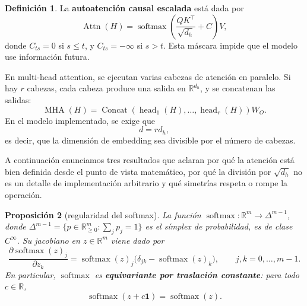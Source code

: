 \documentclass[11pt]{report}
\newenvironment{tcolorbox}[1][]{\par\medskip\noindent\ignorespaces}{\par\medskip}
\theoremstyle{definition}
\newtheorem{definicion}{Definición}[section]
\theoremstyle{plain}
\newtheorem{proposicion}[definicion]{Proposición}
\numberwithin{equation}{section}
\newcommand{\R}{\mathbb{R}}
\newcommand{\softmax}{\operatorname{softmax}}
\begin{document}
\begin{tcolorbox}[colback=blue!8, colframe=blue!8, boxrule=0pt]
\begin{definicion}
La \textbf{autoatención causal escalada} está dada por
\begin{equation*}
    \operatorname{Attn}(H)
    =
    \operatorname{softmax}
    \left(
        \frac{QK^\top}{\sqrt{d_h}}
        +
        C
    \right)V,
\end{equation*}
donde \(C_{ts}=0\) si \(s\leq t\), y \(C_{ts}=-\infty\) si \(s>t\). Esta máscara impide que el modelo use información futura.
\end{definicion}
\end{tcolorbox}

En multi-head attention, se ejecutan varias cabezas de atención en paralelo. Si hay \(r\) cabezas, cada cabeza produce una salida en \(\mathbb{R}^{d_h}\), y se concatenan las salidas:
\begin{equation*}
    \operatorname{MHA}(H)
    =
    \operatorname{Concat}(\operatorname{head}_1(H),\ldots,\operatorname{head}_r(H))W_O.
\end{equation*}
En el modelo implementado, se exige que
\begin{equation*}
    d=r d_h,
\end{equation*}
es decir, que la dimensión de embedding sea divisible por el número de cabezas.

A continuación enunciamos tres resultados que aclaran por qué la atención está bien definida desde el punto de vista matemático, por qué la división por \(\sqrt{d_h}\) no es un detalle de implementación arbitrario y qué simetrías respeta o rompe la operación.

\begin{tcolorbox}[colback=blue!8, colframe=blue!8, boxrule=0pt]
\begin{proposicion}[regularidad del softmax]
La función \(\softmax:\R^m\to\Delta^{m-1}\), donde \(\Delta^{m-1}=\{p\in\R^m_{\geq 0}:\sum_j p_j=1\}\) es el símplex de probabilidad, es de clase \(C^\infty\). Su jacobiano en \(z\in\R^m\) viene dado por
\begin{equation*}
    \frac{\partial\softmax(z)_j}{\partial z_k}
    =
    \softmax(z)_j\bigl(\delta_{jk}-\softmax(z)_k\bigr),
    \qquad j,k=0,\ldots,m-1.
\end{equation*}
En particular, \(\softmax\) es \textbf{equivariante por traslación constante}: para todo \(c\in\R\),
\begin{equation*}
    \softmax(z+c\mathbf{1})=\softmax(z).
\end{equation*}
\end{proposicion}
\end{tcolorbox}
\end{document}
